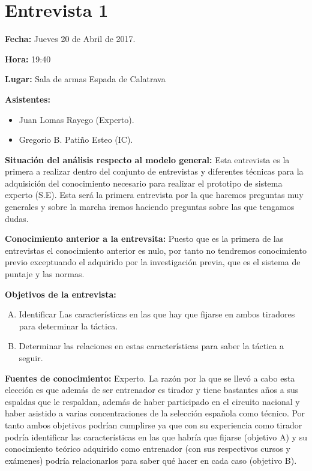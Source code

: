\section{Entrevista 1}

\textbf{Fecha:} Jueves 20 de Abril de 2017.

\textbf{Hora:} 19:40

\textbf{Lugar:} Sala de armas Espada de Calatrava

\textbf{Asistentes:}
  \begin{itemize}
    \item Juan Lomas Rayego (Experto).
    \item Gregorio B. Patiño Esteo (IC).
  \end{itemize}

\textbf{Situación del análisis respecto al modelo general:} Esta entrevista es la primera a realizar dentro del conjunto de entrevistas y diferentes técnicas
 para la adquisición del conocimiento necesario para realizar el prototipo de sistema experto
 (S.E). Esta será la primera entrevista por la que haremos preguntas muy generales y sobre la
 marcha iremos haciendo preguntas sobre las que tengamos dudas.

\textbf{Conocimiento anterior a la entrevsita:} Puesto que es la primera de las entrevistas el conocimiento anterior es nulo, por tanto no
tendremos conocimiento previo exceptuando el adquirido por la investigación previa, que es el
sistema de puntaje y las normas.

\textbf{Objetivos de la entrevista:}
  \begin{enumerate}[(A)]
    \item Identificar Las características en las que hay que fijarse
     en ambos tiradores para determinar la táctica.
    \item Determinar las relaciones en estas características para saber la táctica a seguir.
  \end{enumerate}

\textbf{Fuentes de conocimiento:} Experto.
La razón por la que se llevó a cabo esta elección es que además de ser entrenador es tirador y
tiene bastantes años a sus espaldas que le respaldan, además de haber participado en el circuito
nacional y haber asistido a varias concentraciones de la selección española como técnico. Por
tanto ambos objetivos podrían cumplirse ya que con su experiencia como tirador podría
identificar las características en las que habría que fijarse (objetivo A) y su conocimiento teórico
adquirido como entrenador (con sus respectivos cursos y exámenes) podría relacionarlos para
saber qué hacer en cada caso (objetivo B).

